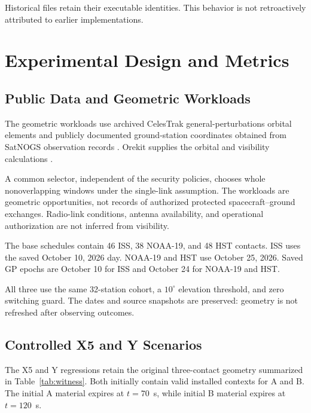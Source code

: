 \documentclass[conference]{IEEEtran}
\begin{document}
Historical files retain their executable identities.
This behavior is not retroactively attributed to earlier
implementations.


\section{Experimental Design and Metrics}
\label{sec:experiments}

\subsection{Public Data and Geometric Workloads}

The geometric workloads use archived CelesTrak
general-perturbations orbital elements \cite{celestrak}
and publicly documented ground-station coordinates obtained
from SatNOGS observation records \cite{satnogs}.
Orekit supplies the orbital and visibility calculations
\cite{orekit}.

A common selector, independent of the security policies,
chooses whole nonoverlapping windows under the single-link
assumption.
The workloads are geometric opportunities, not records of
authorized protected spacecraft--ground exchanges.
Radio-link conditions, antenna availability, and operational
authorization are not inferred from visibility.

The base schedules contain 46 ISS, 38 NOAA-19, and 48 HST
contacts.
ISS uses the saved October 10, 2026 day.
NOAA-19 and HST use October 25, 2026.
Saved GP epochs are October 10 for ISS and October 24
for NOAA-19 and HST.

All three use the same 32-station cohort, a $10^\circ$
elevation threshold, and zero switching guard.
The dates and source snapshots are preserved:
geometry is not refreshed after observing outcomes.

\subsection{Controlled X5 and Y Scenarios}

The X5 and Y regressions retain the original three-contact
geometry summarized in Table~\ref{tab:witness}.
Both initially contain valid installed contexts for A and B.
The initial A material expires at $t=70$~s, while initial B
material expires at $t=120$~s.
\end{document}
